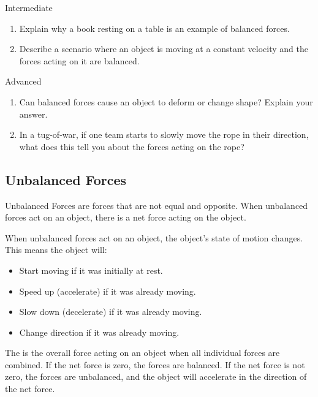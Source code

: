 \begin{tieredquestions}{Intermediate}
\begin{enumerate}
    \item Explain why a book resting on a table is an example of balanced forces.
    \item Describe a scenario where an object is moving at a constant velocity and the forces acting on it are balanced.
\end{enumerate}
\end{tieredquestions}

\begin{tieredquestions}{Advanced}
\begin{enumerate}
    \item  Can balanced forces cause an object to deform or change shape? Explain your answer.
    \item  In a tug-of-war, if one team starts to slowly move the rope in their direction, what does this tell you about the forces acting on the rope?
\end{enumerate}
\end{tieredquestions}


\subsection{Unbalanced Forces}

\begin{keyconcept}{Unbalanced Forces}
 are forces that are not equal and opposite. When unbalanced forces act on an object, there is a net force acting on the object.
\end{keyconcept}

When unbalanced forces act on an object, the object's state of motion changes.  This means the object will:

\begin{itemize}
    \item Start moving if it was initially at rest.
    \item Speed up (accelerate) if it was already moving.
    \item Slow down (decelerate) if it was already moving.
    \item Change direction if it was already moving.
\end{itemize}

The  is the overall force acting on an object when all individual forces are combined.  If the net force is zero, the forces are balanced. If the net force is not zero, the forces are unbalanced, and the object will accelerate in the direction of the net force.

